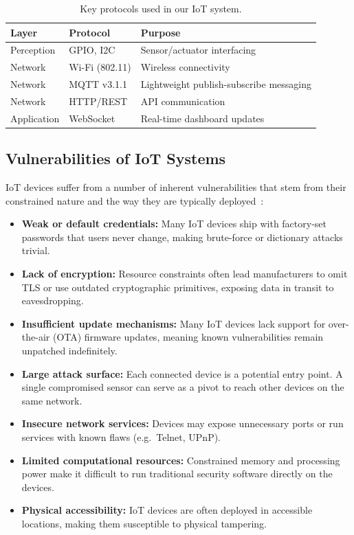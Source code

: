\documentclass[12pt,a4paper]{article}
\begin{document}
\begin{table}[H]
\centering
\caption{Key protocols used in our IoT system.}
\label{tab:protocols}
\begin{tabular}{lll}
\toprule
\textbf{Layer} & \textbf{Protocol} & \textbf{Purpose} \\
\midrule
Perception  & GPIO, I2C           & Sensor/actuator interfacing \\
Network     & Wi-Fi (802.11)      & Wireless connectivity \\
Network     & MQTT v3.1.1         & Lightweight publish-subscribe messaging \\
Network     & HTTP/REST           & API communication \\
Application & WebSocket           & Real-time dashboard updates \\
\bottomrule
\end{tabular}
\end{table}

\subsection{Vulnerabilities of IoT Systems}
\label{sec:vulnerabilities}

IoT devices suffer from a number of inherent vulnerabilities that stem from their constrained nature and the way they are typically deployed~\cite{owasp2018iot, bertino2017botnets}:

\begin{itemize}
    \item \textbf{Weak or default credentials:} Many IoT devices ship with factory-set passwords that users never change, making brute-force or dictionary attacks trivial.
    \item \textbf{Lack of encryption:} Resource constraints often lead manufacturers to omit TLS or use outdated cryptographic primitives, exposing data in transit to eavesdropping.
    \item \textbf{Insufficient update mechanisms:} Many IoT devices lack support for over-the-air (OTA) firmware updates, meaning known vulnerabilities remain unpatched indefinitely.
    \item \textbf{Large attack surface:} Each connected device is a potential entry point. A single compromised sensor can serve as a pivot to reach other devices on the same network.
    \item \textbf{Insecure network services:} Devices may expose unnecessary ports or run services with known flaws (e.g.\ Telnet, UPnP).
    \item \textbf{Limited computational resources:} Constrained memory and processing power make it difficult to run traditional security software directly on the devices.
    \item \textbf{Physical accessibility:} IoT devices are often deployed in accessible locations, making them susceptible to physical tampering.
\end{itemize}
\end{document}
